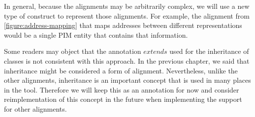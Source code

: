 In general, because the alignments may be arbitrarily complex, we will use a new type of construct to represent those alignments. For example, the alignment from \autoref{figure:address-mapping} that maps addresses between different representations would be a single PIM entity that contains that information.

Some readers may object that the annotation $extends$ used for the inheritance of classes is not consistent with this approach. In the previous chapter, we said that inheritance might be considered a form of alignment. Nevertheless, unlike the other alignments, inheritance is an important concept that is used in many places in the tool. Therefore we will keep this as an annotation for now and consider reimplementation of this concept in the future when implementing the support for other alignments.

